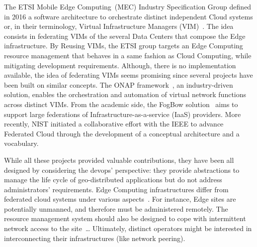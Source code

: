 


%
The ETSI Mobile Edge Computing~(MEC) Industry Specification Group
defined in 2016 a software architecture to orchestrate distinct
independent Cloud systems or, in their terminology, Virtual
Infrastructure Managers (VIM)~\cite{7574435}.
%
The idea consists in federating VIMs of the several Data Centers that
compose the Edge infrastructure.  By Reusing VIMs, the ETSI group targets an Edge
Computing resource management that behaves in a same fashion as Cloud
Computing, while mitigating development requirements.
%
Although, there is no implementation available, the idea of federating
VIMs seems promising since several projects have been built on similar
concepts. The ONAP framework~\cite{onap}, an industry-driven solution,
enables the orchestration and automation of virtual network functions
across distinct VIMs. From the academic side, the FogBow
solution~\cite{brasileiro2016fogbow} aims to support large federations
of Infrastructure-as-a-service (IaaS) providers. More recently, NIST
initiated a collaborative effort with the IEEE to advance Federated
Cloud through the development of a conceptual architecture and a
vocabulary.

While all these projects provided valuable contributions, they have
been all designed by considering the devops' perspective: they provide
abstractions to manage the life cycle of geo-distributed applications
but do not address administrators' requirements.
%
Edge Computing infrastructures differ from federated cloud systems
under various aspects~\cite{openstack:whitepaper}.  For instance, Edge
sites are potentially unmanned, and therefore must be administered
remotely. The resource management system should also be designed to
cope with intermittent network access to the site~\ldots
%
Ultimately, distinct operators might be interested in interconnecting their infrastructures (like network peering).
%

